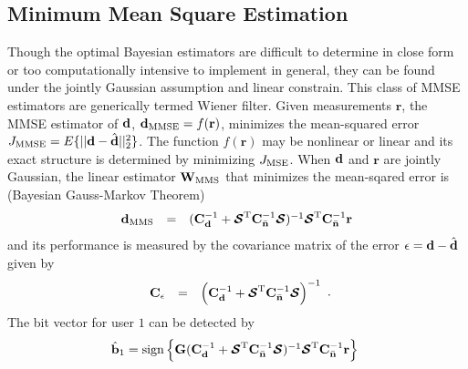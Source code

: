 \documentclass[a4paper,10pt,fleqn, twocolumn]{IEEETran}
\newcommand{\br}{{\mathbf r}}
\newcommand{\bb}{{\bf b}}
\newcommand{\bC}{{\bf C}}
\newcommand{\bd}{{\bf d}}
\newcommand{\bG}{{\bf G}}
\newcommand{\bn}{{\bf n}}
\newcommand{\bbf}{{\bf d}}
\newcommand{\bW}{{\bf W}}
\newcommand{\bcS}{{\mbox {\boldmath ${\cal S}$}}}
\begin{document}
\subsection{Minimum Mean Square Estimation}
Though the optimal Bayesian estimators are difficult to determine
in close form or too computationally intensive to implement in
general, they can be found under the jointly Gaussian assumption
and linear constrain. This class of MMSE estimators are
generically termed Wiener filter. Given measurements $\br$, the
MMSE estimator of $\bd$, ${\bd}_{\rm MMSE} = f( \br )$, minimizes
the mean-squared error $J_{\rm MMSE}=E\{||\bd-\hat{\bd}||_2^2\}$.
The function $f(\br)$ may be nonlinear or linear and its exact
structure is determined by minimizing $J_{\rm MSE}$. When $\bbf$
and $\br$ are jointly Gaussian, the linear estimator $\bW_{\rm
MMS}$ that minimizes the mean-sqared error is (Bayesian
Gauss-Markov Theorem)
\begin{equation}
\begin{array}{rcl}
{\bd}_{\rm MMS}&=&(\bC_{\bbf}^{-1}+\bcS^{\rm
T}\bC_{\bar{\bn}}^{-1}\bcS)^{-1}\bcS^{\rm
T}\bC_{\bar{\bn}}^{-1}\br
\end{array} \label{MSE}
\end{equation}
\noindent and its performance is measured by the covariance matrix
of the error ${\bf\epsilon}=\bd-\hat{\bd}$ given by
\begin{equation}\hspace{-0.0in}
\begin{array}{rcl}
\bC_{\bf\epsilon}&=&\left(\bC_{\bd}^{-1}+\bcS^{\rm
T}\bC_{\bar{\bn}}^{-1}\bcS\right)^{-1}
\end{array}.
\end{equation}
\noindent The bit vector for user $1$ can be detected by
\begin{equation}\hspace{-0.05in}
\begin{array}{l}
\hat{\bb}_1=\mbox{sign}\left\{\bG(\bC_{\bbf}^{-1}+\bcS^{\rm
T}\bC_{\bar{\bn}}^{-1}\bcS)^{-1}\bcS^{\rm
T}\bC_{\bar{\bn}}^{-1}\br\right\}
\end{array}
\end{equation}
\end{document}
